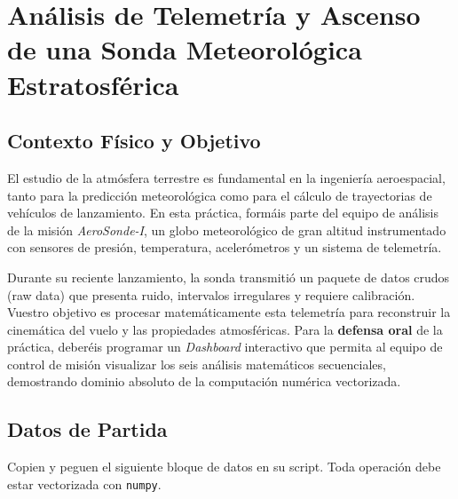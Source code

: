 
\section{Análisis de Telemetría y Ascenso de una Sonda Meteorológica Estratosférica }



	
	\subsection*{Contexto Físico y Objetivo}
	
	El estudio de la atmósfera terrestre es fundamental en la ingeniería aeroespacial, tanto para la predicción meteorológica como para el cálculo de trayectorias de vehículos de lanzamiento. En esta práctica, formáis parte del equipo de análisis de la misión \textit{AeroSonde-I}, un globo meteorológico de gran altitud instrumentado con sensores de presión, temperatura, acelerómetros y un sistema de telemetría.
	
	Durante su reciente lanzamiento, la sonda transmitió un paquete de datos crudos (raw data) que presenta ruido, intervalos irregulares y requiere calibración. Vuestro objetivo es procesar matemáticamente esta telemetría para reconstruir la cinemática del vuelo y las propiedades atmosféricas. Para la \textbf{defensa oral} de la práctica, deberéis programar un \textit{Dashboard} interactivo que permita al equipo de control de misión visualizar los seis análisis matemáticos secuenciales, demostrando dominio absoluto de la computación numérica vectorizada.
	
	\subsection*{Datos de Partida}
	
	Copien y peguen el siguiente bloque de datos en su script. 
	Toda operación debe estar vectorizada con \texttt{numpy}.
	
